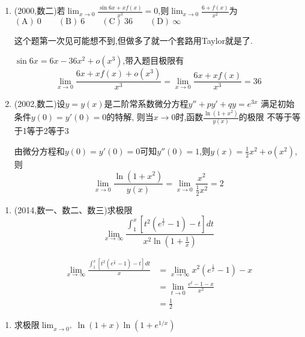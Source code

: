 \documentclass[12pt, a4paper, oneside, UTF8]{ctexbook}
\begin{document}
\begin{enumerate}[label=\arabic*.,start=4]
    \item  (2000,数二)若$\displaystyle \lim_{x\to0}\frac{\sin6x+xf(x)}{x^3}=0$,则$\displaystyle \lim_{x\to0}\frac{6+f(x)}{x^2}$为 \\
    $(\text{A}) \ 0 \qquad (\text{B})\ 6 \qquad (\text{C})\ 36 \qquad (\text{D})\ \infty$
    
    \begin{solution}
    这个题第一次见可能想不到,但做多了就一个套路用Taylor就是了.

    $\sin{6x}=6x-36x^2+o(x^3)$,带入题目极限有
    \[
    \lim_{x\to 0}\frac{6x+xf(x)+o(x^3)}{x^3} = \lim_{x\to 0}\frac{6x+xf(x)}{x^3} = 36
    \]
    \end{solution}
    
    \item  (2002,数二)设$y=y(x)$是二阶常系数微分方程$y''+py'+qy=e^{3x}$
    满足初始条件$y(0)=y'(0)=0$的特解,
    则当$x\to0$时,函数$\frac{\ln(1+x^2)}{y(x)}$的极限
    \newline
    不等于\qquad {}等于1\qquad {}等于2\qquad {}等于3
    
    \begin{solution}
    由微分方程和$y(0)=y'(0)=0$可知$y''(0)=1$,则$y(x)=\frac{1}{2}x^2+o(x^2)$,则
    \[
    \lim_{x\to 0}\frac{\ln(1+x^2)}{y(x)} = \lim_{x\to 0}\frac{x^2}{\frac{1}{2}x^2} = 2
    \]
    \end{solution}
\end{enumerate}

\begin{enumerate}[label=\arabic*.,start=6]
    \item  (2014,数一、数二、数三)求极限
    \[
    \lim_{x\to \infty}\frac{\int_{1}^{x}\left[t^2(e^{\frac{1}{t}} - 1) - t\right]dt}
    {x^2\ln{(1+\frac{1}{x})}}
    \]
    \begin{solution}
    \begin{align*}
        \lim_{x\to \infty}\frac{\int_{1}^{x}\left[t^2(e^{\frac{1}{t}} - 1) - t\right]dt}
        {x} &= \lim_{x\to \infty} x^2(e^{\frac{1}{x}}-1)-x \\
        & =\lim_{t\to 0}\frac{e^t-1-x}{x^2} \\
        & = \frac{1}{2}
    \end{align*}
    \end{solution}
\end{enumerate}

\begin{enumerate}[label=\arabic*.,start=7]
    \item  求极限$\lim_{x\to0^+}\ln(1+x)\ln\left(1+e^{1/x}\right)$
    
    \begin{solution}
    
    \end{solution}
\end{enumerate}
\end{document}
